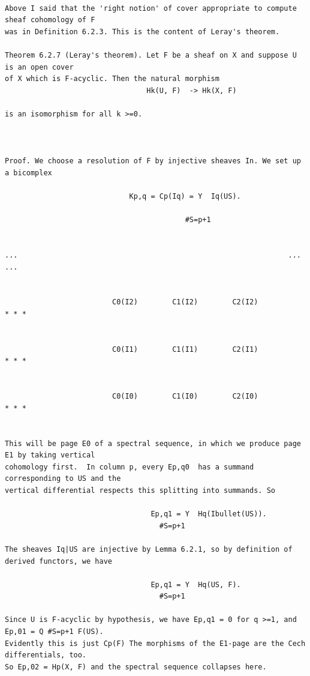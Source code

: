 \begin{Verbatim}[fontsize=\footnotesize]

Above I said that the 'right notion' of cover appropriate to compute sheaf cohomology of F
was in Definition 6.2.3. This is the content of Leray's theorem.

Theorem 6.2.7 (Leray's theorem). Let F be a sheaf on X and suppose U is an open cover
of X which is F-acyclic. Then the natural morphism
                                 Hk(U, F)  -> Hk(X, F)

is an isomorphism for all k >=0.



Proof. We choose a resolution of F by injective sheaves In. We set up a bicomplex

                             Kp,q = Cp(Iq) = Y  Iq(US).

                                          #S=p+1

                                                                                                                            ...                                                               ...                                                               ...


                         C0(I2)        C1(I2)        C2(I2)            * * *


                         C0(I1)        C1(I1)        C2(I1)            * * *


                         C0(I0)        C1(I0)        C2(I0)            * * *


This will be page E0 of a spectral sequence, in which we produce page E1 by taking vertical
cohomology first.  In column p, every Ep,q0  has a summand corresponding to US and the
vertical differential respects this splitting into summands. So

                                  Ep,q1 = Y  Hq(Ibullet(US)).
                                    #S=p+1

The sheaves Iq|US are injective by Lemma 6.2.1, so by definition of derived functors, we have

                                  Ep,q1 = Y  Hq(US, F).
                                    #S=p+1

Since U is F-acyclic by hypothesis, we have Ep,q1 = 0 for q >=1, and Ep,01 = Q #S=p+1 F(US).
Evidently this is just Cp(F) The morphisms of the E1-page are the Cech differentials, too.
So Ep,02 = Hp(X, F) and the spectral sequence collapses here.


\end{Verbatim}

